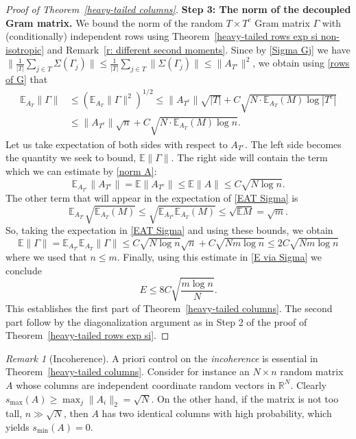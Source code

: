 \documentclass[10pt, openany]{book}
\theoremstyle{remark}
\newtheorem{remark}[theorem]{Remark}
\def \R {\mathbb{R}}
\def \E {\mathbb{E}}
\def \smin {s_{\min}}
\def \smax {s_{\max}}
\begin{document}
\begin{proof}[Proof of Theorem~\ref{heavy-tailed columns}]
{\bf Step 3: The norm of the decoupled Gram matrix.}
We bound the norm of the random $T \times T^c$ Gram matrix $\Gamma$ 
with (conditionally) independent rows using Theorem~\ref{heavy-tailed rows exp si non-isotropic}
and Remark~\ref{r: different second moments}. 
Since by \eqref{Sigma Gj} we have
$\big\| \frac{1}{|T|} \sum_{j \in T} \Sigma(\Gamma_j) \big\| 
\le \frac{1}{|T|} \sum_{j \in T} \|\Sigma(\Gamma_j)\|
\le \|A_{T^c}\|^2$,  
we obtain using \eqref{rows of G} that
\begin{align}								\label{EAT Sigma}
\E_{A_T} \|\Gamma\| 
&\le (\E_{A_T} \|\Gamma\|^2)^{1/2} 
\le \|A_{T^c}\| \sqrt{|T|} + C \sqrt{N \cdot \E_{A_T} (M) \log |T^c|} \nonumber\\
&\le \|A_{T^c}\| \sqrt{n} + C \sqrt{N \cdot \E_{A_T} (M) \log n}.
\end{align}
Let us take expectation of both sides with respect to $A_{T^c}$.
The left side becomes the quantity we seek to bound, $\E \|\Gamma\|$.
The right side will contain the term which we can estimate by \eqref{norm A}:
$$
\E_{A_{T^c}} \|A_{T^c}\| = \E \|A_{T^c}\| \le \E \|A\| \le C \sqrt{N \log n}.
$$
The other term that will appear in the expectation of \eqref{EAT Sigma}
is 
$$
\E_{A_{T^c}} \sqrt{\E_{A_T} (M)}
\le \sqrt{\E_{A_{T^c}} \E_{A_T} (M)}
\le \sqrt{\E M}
= \sqrt{m}.
$$
So, taking the expectation in \eqref{EAT Sigma} and using these bounds, we obtain
$$
\E \|\Gamma\| 
= \E_{A_{T^c}} \E_{A_T} \|\Gamma\|
\le C \sqrt{N \log n} \sqrt{n} + C \sqrt{N m \log n}
\le 2C \sqrt{N m \log n}
$$ 
where we used that $n \le m$.
Finally, using this estimate in \eqref{E via Sigma} we conclude 
$$
E \le 8C \sqrt{\frac{m \log n}{N}}.
$$
This establishes the first part of Theorem~\ref{heavy-tailed columns}. 
The second part follow by the diagonalization argument
as in Step 2 of the proof of Theorem~\ref{heavy-tailed rows exp si}.
\end{proof}


\begin{remark}[Incoherence]
  A priori control on the {\em incoherence}  is essential in Theorem~\ref{heavy-tailed columns}.
  Consider for instance an $N \times n$ random matrix $A$ whose columns are independent coordinate random 
  vectors in $\R^N$. Clearly $\smax(A) \ge \max_j \|A_i\|_2 = \sqrt{N}$.
  On the other hand, if the matrix is not too tall, $n \gg \sqrt{N}$, then $A$ has two identical columns 
  with high probability, which yields $\smin(A)=0$. 
\end{remark}
\end{document}

